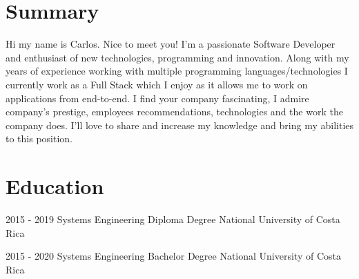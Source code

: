 \documentclass[letterpaper]{twentysecondcv} %
\begin{document}
\makeprofile
\section{Summary}
\small{Hi my name is Carlos. Nice to meet you! I'm a passionate Software Developer and enthusiast of new technologies, programming and innovation. Along with my years of experience working with multiple programming languages/technologies I currently work as a Full Stack which I enjoy as it allows me to work on applications from end-to-end. I find your company fascinating, I admire company's prestige, employees recommendations, technologies and the work the company does. I'll love to share and increase my knowledge and bring my abilities to this position.

}

\section{Education}

\begin{twenty}
	\twentyitem
    	{2015 - 2019}
        {Systems Engineering Diploma Degree}
        {National University of Costa Rica}
        {}
      
	\twentyitem
    	{2015 - 2020}
        {Systems Engineering Bachelor Degree}
        {National University of Costa Rica}
        {}

\end{twenty}
\end{document}
